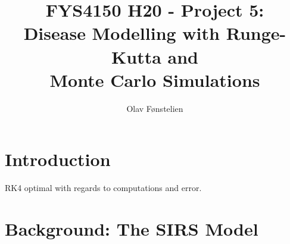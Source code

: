 \documentclass[]{article}
\title{FYS4150 H20 - Project 5:\\Disease Modelling with Runge-Kutta and\\Monte Carlo Simulations}
\author{Olav Fønstelien}
\begin{document}
\maketitle

\begin{abstract}

\end{abstract}

\section{Introduction} \label{sec:intro}

RK4 optimal with regards to computations and error.

\section{Background: The SIRS Model} \label{sec:background-sirs}
\end{document}
